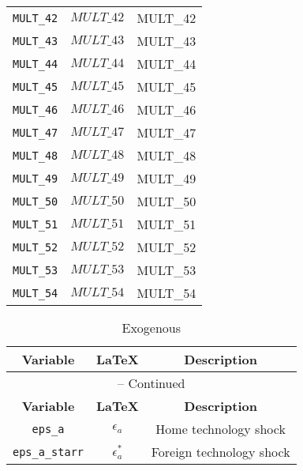 \begin{center}
\begin{longtable}{ccc}
\texttt{MULT\_42} & $MULT\_42$ & MULT\_42\\
\texttt{MULT\_43} & $MULT\_43$ & MULT\_43\\
\texttt{MULT\_44} & $MULT\_44$ & MULT\_44\\
\texttt{MULT\_45} & $MULT\_45$ & MULT\_45\\
\texttt{MULT\_46} & $MULT\_46$ & MULT\_46\\
\texttt{MULT\_47} & $MULT\_47$ & MULT\_47\\
\texttt{MULT\_48} & $MULT\_48$ & MULT\_48\\
\texttt{MULT\_49} & $MULT\_49$ & MULT\_49\\
\texttt{MULT\_50} & $MULT\_50$ & MULT\_50\\
\texttt{MULT\_51} & $MULT\_51$ & MULT\_51\\
\texttt{MULT\_52} & $MULT\_52$ & MULT\_52\\
\texttt{MULT\_53} & $MULT\_53$ & MULT\_53\\
\texttt{MULT\_54} & $MULT\_54$ & MULT\_54\\
\hline%
\end{longtable}
\end{center}
\begin{center}
\begin{longtable}{ccc}
\caption{Exogenous}\\%
\hline%
\multicolumn{1}{c}{\textbf{Variable}} &
\multicolumn{1}{c}{\textbf{\LaTeX}} &
\multicolumn{1}{c}{\textbf{Description}}\\%
\hline\hline%
\endfirsthead
\multicolumn{3}{c}{{\tablename} \thetable{} -- Continued}\\%
\hline%
\multicolumn{1}{c}{\textbf{Variable}} &
\multicolumn{1}{c}{\textbf{\LaTeX}} &
\multicolumn{1}{c}{\textbf{Description}}\\%
\hline\hline%
\endhead
\texttt{eps\_a} & ${\epsilon_a}$ & Home technology shock\\
\texttt{eps\_a\_starr} & ${\epsilon_a^*}$ & Foreign technology shock\\
\hline%
\end{longtable}
\end{center}

